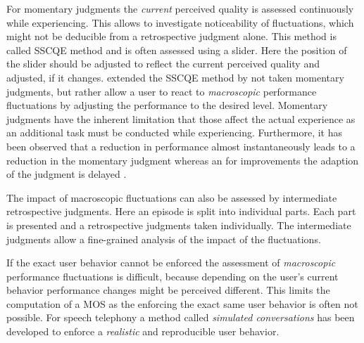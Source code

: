 For momentary judgments the \emph{current} perceived quality is assessed continuously while experiencing.
This allows to investigate noticeability of fluctuations, which might not be deducible from a retrospective judgment alone.
This method is called \ac{SSCQE} method \citep[][p. 137]{weiss_temporal_2014} and is often assessed using a slider.
Here the position of the slider should be adjusted to reflect the current perceived quality and adjusted, if it changes.
\citet{borowiak_long_2013} extended the \ac{SSCQE} method by not taken momentary judgments, but rather allow a user to react to \emph{macroscopic} performance fluctuations by adjusting the performance to the desired level.
Momentary judgments have the inherent limitation that those affect the actual experience as an additional task must be conducted while experiencing.
Furthermore, it has been observed that a reduction in performance almost instantaneously leads to a reduction in the momentary judgment whereas an for improvements the adaption of the judgment is delayed
\cite[\eg,][]{hands_recency_2001, weiss_temporal_2014, hamberg_time-varying_1999}.

The impact of macroscopic fluctuations can also be assessed by intermediate retrospective judgments.
Here an episode is split into individual parts.
Each part is presented and a retrospective judgments taken individually.
The intermediate judgments allow a fine-grained analysis of the impact of the fluctuations.

If the exact user behavior cannot be enforced the assessment of \emph{macroscopic} performance fluctuations is difficult, because depending on the user's current behavior performance changes might be perceived different.
This limits the computation of a \ac{MOS} as the enforcing the exact same user behavior is often not possible.
For speech telephony a method called \emph{simulated conversations} \citep{berger_estimation_2008} has been developed to enforce a \emph{realistic} and reproducible user behavior.

